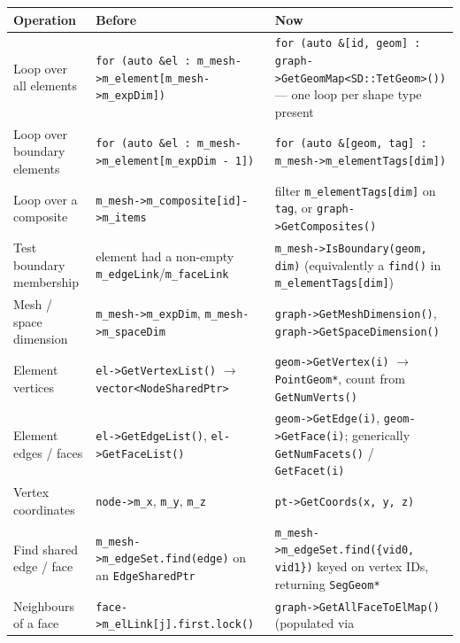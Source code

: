 \begin{table}[h!]
  \centering
  \small
  \begin{tabular}{p{}p{}p{}}
    \hline
    \textbf{Operation} & \textbf{Before} & \textbf{Now}\\
    \hline
    Loop over all elements &
    \texttt{for (auto \&el : m\_mesh->m\_element[m\_mesh->m\_expDim])} &
    \texttt{for (auto \&[id, geom] : graph->GetGeomMap<SD::TetGeom>())}
    --- one loop per shape type present\\
    \hline
    Loop over boundary elements &
    \texttt{for (auto \&el : m\_mesh->m\_element[m\_expDim - 1])} &
    \texttt{for (auto \&[geom, tag] : m\_mesh->m\_elementTags[dim])}\\
    \hline
    Loop over a composite &
    \texttt{m\_mesh->m\_composite[id]->m\_items} &
    filter \texttt{m\_elementTags[dim]} on \texttt{tag}, or
    \texttt{graph->GetComposites()}\\
    \hline
    Test boundary membership &
    element had a non-empty \texttt{m\_edgeLink}/\texttt{m\_faceLink} &
    \texttt{m\_mesh->IsBoundary(geom, dim)} (equivalently a
    \texttt{find()} in \texttt{m\_elementTags[dim]})\\
    \hline
    Mesh / space dimension &
    \texttt{m\_mesh->m\_expDim}, \texttt{m\_mesh->m\_spaceDim} &
    \texttt{graph->GetMeshDimension()},
    \texttt{graph->GetSpaceDimension()}\\
    \hline
    Element vertices &
    \texttt{el->GetVertexList()} $\rightarrow$
    \texttt{vector<NodeSharedPtr>} &
    \texttt{geom->GetVertex(i)} $\rightarrow$ \texttt{PointGeom*},
    count from \texttt{GetNumVerts()}\\
    \hline
    Element edges / faces &
    \texttt{el->GetEdgeList()}, \texttt{el->GetFaceList()} &
    \texttt{geom->GetEdge(i)}, \texttt{geom->GetFace(i)}; generically
    \texttt{GetNumFacets()} / \texttt{GetFacet(i)}\\
    \hline
    Vertex coordinates &
    \texttt{node->m\_x}, \texttt{m\_y}, \texttt{m\_z} &
    \texttt{pt->GetCoords(x, y, z)}\\
    \hline
    Find shared edge / face &
    \texttt{m\_mesh->m\_edgeSet.find(edge)} on an
    \texttt{EdgeSharedPtr} &
    \texttt{m\_mesh->m\_edgeSet.find(\{vid0, vid1\})} keyed on vertex
    IDs, returning \texttt{SegGeom*}\\
    \hline
    Neighbours of a face &
    \texttt{face->m\_elLink[j].first.lock()} &
    \texttt{graph->GetAllFaceToElMap()} (populated via

\end{tabular}
\end{table}
